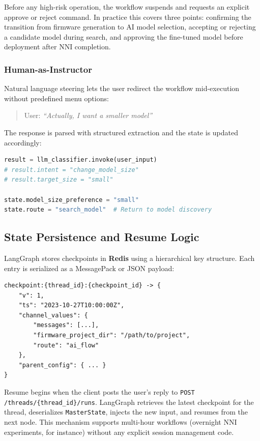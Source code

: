 Before any high-risk operation, the workflow suspends and requests an explicit approve or reject command. In practice this covers three points: confirming the transition from firmware generation to AI model selection, accepting or rejecting a candidate model during search, and approving the fine-tuned model before deployment after NNI completion.

\subsubsection{Human-as-Instructor}

Natural language steering lets the user redirect the workflow mid-execution without predefined menu options:

\begin{quote}
    User: \textit{``Actually, I want a smaller model''}
\end{quote}

The response is parsed with structured extraction and the state is updated accordingly:

\begin{lstlisting}[language=Python]
result = llm_classifier.invoke(user_input)
# result.intent = "change_model_size"
# result.target_size = "small"

state.model_size_preference = "small"
state.route = "search_model"  # Return to model discovery
\end{lstlisting}

\subsection{State Persistence and Resume Logic}

LangGraph stores checkpoints in \textbf{Redis} using a hierarchical key structure. Each entry is serialized as a MessagePack or JSON payload:

\begin{verbatim}
checkpoint:{thread_id}:{checkpoint_id} -> {
    "v": 1,
    "ts": "2023-10-27T10:00:00Z",
    "channel_values": {
        "messages": [...],
        "firmware_project_dir": "/path/to/project",
        "route": "ai_flow"
    },
    "parent_config": { ... }
}
\end{verbatim}

Resume begins when the client posts the user's reply to \texttt{POST /threads/\{thread\_id\}/runs}. LangGraph retrieves the latest checkpoint for the thread, deserializes \texttt{MasterState}, injects the new input, and resumes from the next node. This mechanism supports multi-hour workflows (overnight NNI experiments, for instance) without any explicit session management code.

